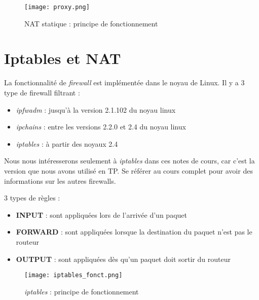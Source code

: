 \documentclass[journal, a4paper]{IEEEtran}
\begin{document}
\begin{figure}[!hbt]
	\begin{center}
	\texttt{[image: proxy.png]}
	\caption{NAT statique : principe de fonctionnement}
	\label{fig:proxy}
	\end{center}
\end{figure}

\newpage
\section{Iptables et NAT}

La fonctionnalité de \textit{firewall} est implémentée dans le noyau de Linux. Il y a 3 type de firewall filtrant :
\begin{itemize}
	\item \textit{ipfwadm} : jusqu’à la version 2.1.102 du noyau linux
	\item \textit{ipchains} : entre les versions 2.2.0 et 2.4 du noyau linux
	\item \textit{iptables} : à  partir des noyaux 2.4
\end{itemize}

Nous nous intéresserons seulement à \textit{iptables} dans ces notes de cours, car c'est la version que nous avons utilisé en TP. Se référer au cours complet pour avoir des informations sur les autres firewalls.

3 types de règles :
\begin{itemize}
	\item \textbf{INPUT} : sont appliquées lors de l’arrivée d’un paquet
	\item \textbf{FORWARD} : sont appliquées lorsque la destination du paquet n'est pas le routeur
	\item \textbf{OUTPUT} : sont appliquées dès qu'un paquet doit sortir du routeur
\end{itemize}

\begin{figure}[!hbt]
	\begin{center}
	\texttt{[image: iptables\_fonct.png]}
	\caption{\textit{iptables} : principe de fonctionnement}
	\label{fig:iptables_fonct}
	\end{center}
\end{figure}
\end{document}

